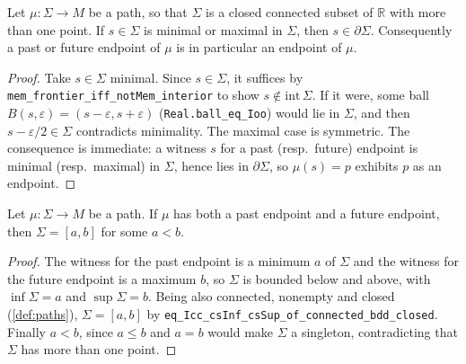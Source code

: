 \begin{lemma}
    \label{lmm:extremal-parameter-mem-frontier}
    \leanok
    Let $\mu : \Sigma \to M$ be a path, so that $\Sigma$ is a closed connected subset of $\mathbb{R}$ with more than one point. If $s \in \Sigma$ is minimal or maximal in $\Sigma$, then $s \in \partial\Sigma$. Consequently a past or future endpoint of $\mu$ is in particular an endpoint of $\mu$.
\end{lemma}
\begin{proof}
    \leanok
    Take $s \in \Sigma$ minimal. Since $s \in \Sigma$, it suffices by \texttt{mem\_frontier\_iff\_notMem\_interior} to show $s \notin \mathrm{int}\,\Sigma$. If it were, some ball $B(s,\varepsilon) = (s-\varepsilon, s+\varepsilon)$ (\texttt{Real.ball\_eq\_Ioo}) would lie in $\Sigma$, and then $s - \varepsilon/2 \in \Sigma$ contradicts minimality. The maximal case is symmetric. The consequence is immediate: a witness $s$ for a past (resp.\ future) endpoint is minimal (resp.\ maximal) in $\Sigma$, hence lies in $\partial\Sigma$, so $\mu(s) = p$ exhibits $p$ as an endpoint.
\end{proof}

\begin{lemma}
    \label{lmm:endpoint-parameter-space-eq-Icc}
    \leanok
    Let $\mu : \Sigma \to M$ be a path. If $\mu$ has both a past endpoint and a future endpoint, then $\Sigma = [a,b]$ for some $a < b$.
\end{lemma}
\begin{proof}
    \leanok
    The witness for the past endpoint is a minimum $a$ of $\Sigma$ and the witness for the future endpoint is a maximum $b$, so $\Sigma$ is bounded below and above, with $\inf\Sigma = a$ and $\sup\Sigma = b$. Being also connected, nonempty and closed (\ref{def:paths}), $\Sigma = [a,b]$ by \texttt{eq\_Icc\_csInf\_csSup\_of\_connected\_bdd\_closed}. Finally $a < b$, since $a \le b$ and $a = b$ would make $\Sigma$ a singleton, contradicting that $\Sigma$ has more than one point.
\end{proof}

